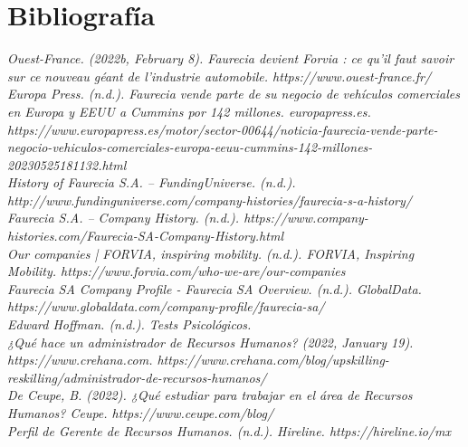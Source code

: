 \documentclass[letterpaper,12pt]{article}
\begin{document}
\begin{sloppypar}
\newpage
\section{\textcolor[rgb]{0.4,0.4,0.9}{Bibliografía}}
\textit{Ouest-France. (2022b, February 8). Faurecia devient Forvia : ce qu'il faut savoir sur ce nouveau géant de l'industrie automobile. https://www.ouest-france.fr/}
\vspace{0.3cm}\\ 
\textit{Europa Press. (n.d.). Faurecia vende parte de su negocio de vehículos comerciales en Europa y EEUU a Cummins por 142 millones. europapress.es. https://www.europapress.es/motor/sector-00644/noticia-faurecia-vende-parte-negocio-vehiculos-comerciales-europa-eeuu-cummins-142-millones-20230525181132.html}
\vspace{0.3cm}\\ 
\textit{History of Faurecia S.A. – FundingUniverse. (n.d.). http://www.fundinguniverse.com/company-histories/faurecia-s-a-history/}
\vspace{0.3cm}\\ 
\textit{Faurecia S.A. -- Company History. (n.d.). https://www.company-histories.com/Faurecia-SA-Company-History.html}
\vspace{0.3cm}\\ 
\textit{Our companies | FORVIA, inspiring mobility. (n.d.). FORVIA, Inspiring Mobility. https://www.forvia.com/who-we-are/our-companies}
\vspace{0.3cm}\\ 
\textit{Faurecia SA Company Profile - Faurecia SA Overview. (n.d.). GlobalData. https://www.globaldata.com/company-profile/faurecia-sa/}
\vspace{0.3cm}\\ 
\textit{Edward Hoffman. (n.d.). Tests Psicológicos.}
\vspace{0.3cm}\\ 
\textit{¿Qué hace un administrador de Recursos Humanos? (2022, January 19). https://www.crehana.com. https://www.crehana.com/blog/upskilling-reskilling/administrador-de-recursos-humanos/}
\vspace{0.3cm}\\ 
\textit{De Ceupe, B. (2022). ¿Qué estudiar para trabajar en el área de Recursos Humanos? Ceupe. https://www.ceupe.com/blog/}
\vspace{0.3cm}\\ 
\textit{Perfil de Gerente de Recursos Humanos. (n.d.). Hireline. https://hireline.io/mx}
\vspace{0.3cm}\\ 

\end{sloppypar}
\end{document}
